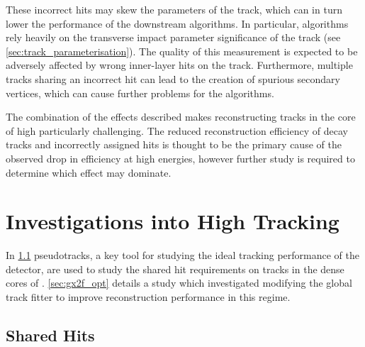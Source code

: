 These incorrect hits may skew the parameters of the track, which can in turn lower the performance of the downstream \btagging algorithms.
In particular, \btagging algorithms rely heavily on the transverse impact parameter significance \dzerosig of the track (see \cref{sec:track_parameterisation}).
The quality of this measurement is expected to be adversely affected by wrong inner-layer hits on the track.
Furthermore, multiple tracks sharing an incorrect hit can lead to the creation of spurious secondary vertices, which can cause further problems for the \btagging algorithms.

The combination of the effects described makes reconstructing tracks in the core of high \pT \bjets particularly challenging.
The reduced reconstruction efficiency of \bhadron decay tracks and incorrectly assigned hits is thought to be the primary cause of the observed drop in \btagging efficiency at high energies, however further study is required to determine which effect may dominate.








\section{Investigations into High \texorpdfstring{\pT}{pT} \bhadron Tracking}\label{sec:b_track_reco_improvements}

In \cref{sec:sharedhits} pseudotracks, a key tool for studying the ideal tracking performance of the \ATLAS detector, are used to study the shared hit requirements on tracks in the dense cores of \highpt \bjets.
\cref{sec:gx2f_opt} details a study which investigated modifying the global track fitter to improve reconstruction performance in this regime.


\subsection{Shared Hits}\label{sec:sharedhits}



